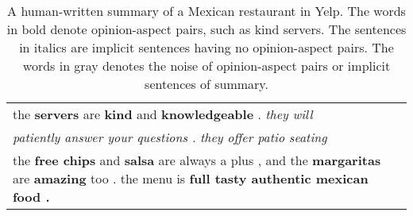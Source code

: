 \begin{table}[th]
			\begin{tabular}{|p{7.2cm}|}
			\hline \rule{0pt}{10pt}
			 \makecell[c]{\bf Gold Summary} \\
			\hline
			the \textbf{servers} are \textbf{kind} and \textbf{knowledgeable} . \textit{they will} \\
			\textit{patiently answer your questions .} \textit{they offer patio  seating} \\
			the \textbf{free chips} and \textbf{salsa} are always a plus , and the \textbf{margaritas} are \textbf{amazing} too . the menu is \textbf{full tasty authentic mexican food .} \\
			\hline
		\end{tabular}
	\caption{A human-written summary of a Mexican
restaurant in Yelp. The words in bold denote opinion-aspect pairs, 
such as kind servers. The sentences in italics are implicit sentences having no 
opinion-aspect pairs. The words in gray denotes the noise of opinion-aspect pairs or implicit sentences of summary.
	}\label{tab:example}  
\end{table}

